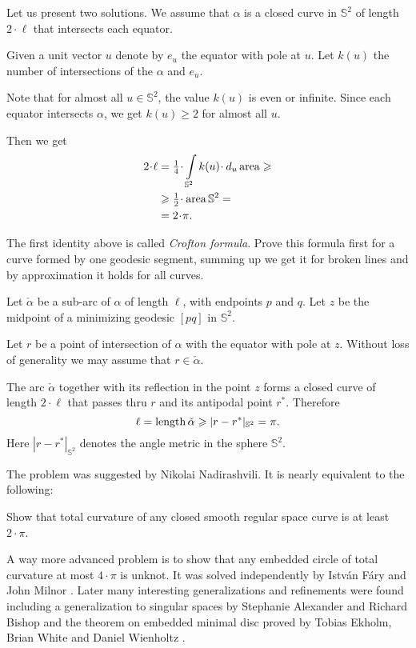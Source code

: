 Let us present two solutions.
We assume that $\alpha$ is a closed curve in $\mathbb{S}^2$ of length $2\cdot\ell$ that intersects each equator.

Given a unit vector $u$ denote by $e_u$ the equator with pole at $u$.
Let $k(u)$ the number of intersections
of the $\alpha$ and $e_u$.

Note that for almost all $u\in \mathbb{S}^2$, the value $k(u)$ is even or infinite.
Since each equator intersects $\alpha$, we get $k(u)\ge 2$ for almost all $u$.

Then we get
\begin{align*}
2\cdot\ell&=\tfrac14\cdot\int\limits_{\mathbb{S}^2}k(u)\cdot\, d_u\area\ge 
\\
&\ge\tfrac12\cdot\area\mathbb{S}^2=
\\
&=2\cdot\pi.
\end{align*}

The first identity above is called \emph{Crofton formula}.
Prove this formula first for a curve formed by one geodesic segment,
summing up we get it for broken lines
and by approximation it holds for all curves.
\qeds

Let $\check\alpha$ be a sub-arc of $\alpha$ of length $\ell$, with endpoints $p$ and $q$. 
Let $z$ be the midpoint of a minimizing geodesic $[pq]$ in $\mathbb{S}^2$. 

Let $r$ be a point of intersection of $\alpha$ with the equator with pole at $z$. 
Without loss of generality we may assume that $r\in\check\alpha$. 

The arc $\check\alpha$ together with its reflection in the point $z$ forms a closed curve of length $2\cdot \ell$ that passes thru $r$ and its antipodal point $r^{*}$.
Therefore 
\[\ell=\operatorname{\rm length} \check\alpha\geqslant |r-r^{*}|_{\mathbb S^2}=\pi.\]
Here $|r-r^{*}|_{\mathbb S^2}$ 
denotes the angle metric in the sphere $\mathbb S^2$.\qeds


The problem was suggested by Nikolai Nadirashvili.
It is nearly equivalent to the following: 

\begin{pr}
Show that total curvature of any closed smooth regular space curve is at least $2\cdot\pi$.
\end{pr}

A way more advanced problem is to show that any embedded circle of total curvature at most $4\cdot\pi$ is unknot.
It was solved independently by Istv{\'a}n F{\'a}ry \cite[see][]{fary-knot} and John Milnor \cite[see][]{milnor}. 
Later many interesting generalizations and refinements were found including a generalization to singular spaces 
by Stephanie Alexander and Richard Bishop \cite[see][]{alexander-bishop:knot} and the
theorem on embedded minimal disc proved by Tobias Ekholm, 
Brian White
and Daniel Wienholtz \cite[see][]{EWW}.

